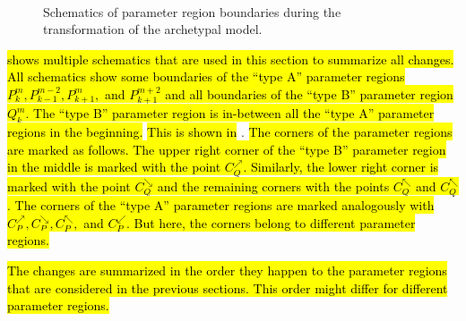 \begin{figure}
{		\label{fig:add.change.schema.d}
	} \\
	\caption[Schematics of parameter region boundaries during the transformation of the archetypal model]{
		Schematics of parameter region boundaries during the transformation of the archetypal model.
	}
	\label{fig:add.change.schema}
\end{figure}

 \hl{shows multiple schematics that are used in this section to summarize all changes.}
\hl{
All schematics show some boundaries of the ``type A'' parameter regions $P^m_k, P^{m-2}_{k-1}, P^m_{k+1},$ and $P^{m+2}_{k+1}$ and all boundaries of the ``type B'' parameter region $Q^m_k$.
The ``type B'' parameter region is in-between all the ``type A'' parameter regions in the beginning.
}
\hl{This is shown in} .
\hl{
	The corners of the parameter regions are marked as follows.
	The upper right corner of the ``type B'' parameter region in the middle is marked with the point $C_Q^\nearrow$.
	Similarly, the lower right corner is marked with the point $C_Q^\searrow$ and the remaining corners with the points $C_Q^\nwarrow$ and $C_Q^\nwarrow$.
	The corners of the ``type A'' parameter regions are marked analogously with $C_P^\nearrow, C_P^\searrow, C_P^\nwarrow,$ and $C_P^\swarrow$.
	But here, the corners belong to different parameter regions.
}

\hl{
	The changes are summarized in the order they happen to the parameter regions that are considered in the previous sections.
	This order might differ for different parameter regions.
}

